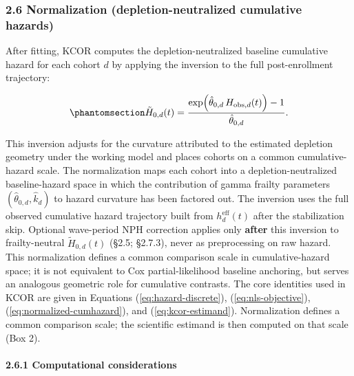 \documentclass[
]{article}
\begin{document}
\subsubsection{2.6 Normalization (depletion-neutralized cumulative hazards)}\label{normalization-depletion-neutralized-cumulative-hazards}

After fitting, KCOR computes the depletion-neutralized baseline cumulative hazard for each cohort \(d\) by applying the inversion to the full post-enrollment trajectory:

\begin{equation}\protect\phantomsection\label{eq:normalized-cumhazard}{\tilde H_{0,d}(t) = \frac{\exp\!\left(\hat{\theta}_{0,d}\,H_{\mathrm{obs},d}(t)\right)-1}{\hat{\theta}_{0,d}}.}\end{equation}

This inversion adjusts for the curvature attributed to the estimated depletion geometry under the working model and places cohorts on a common cumulative-hazard scale. The normalization maps each cohort into a depletion-neutralized baseline-hazard space in which the contribution of gamma frailty parameters \((\hat{\theta}_{0,d}, \hat{k}_d)\) to hazard curvature has been factored out. The inversion uses the full observed cumulative hazard trajectory built from \(h_d^{\mathrm{eff}}(t)\) after the stabilization skip. Optional wave-period NPH correction applies only \textbf{after} this inversion to frailty-neutral \(\tilde H_{0,d}(t)\) (§2.5; §2.7.3), never as preprocessing on raw hazard. This normalization defines a common comparison scale in cumulative-hazard space; it is not equivalent to Cox partial-likelihood baseline anchoring, but serves an analogous geometric role for cumulative contrasts. The core identities used in KCOR are given in Equations (\ref{eq:hazard-discrete}), (\ref{eq:nls-objective}), (\ref{eq:normalized-cumhazard}), and (\ref{eq:kcor-estimand}). Normalization defines a common comparison scale; the scientific estimand is then computed on that scale (Box 2).

\paragraph{2.6.1 Computational considerations}\label{computational-considerations}
\end{document}

